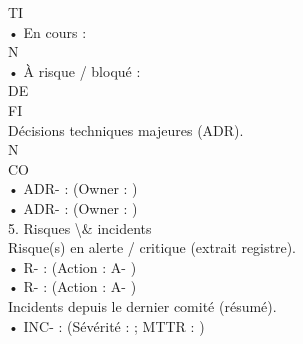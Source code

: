 \vspace{0.5em}
TI\\
• En cours :\\
\vspace{0.5em}
\vspace{0.5em}
\vspace{0.5em}
\vspace{0.5em}
N\\
• À risque / bloqué :\\
\vspace{0.5em}
\vspace{0.5em}
\vspace{0.5em}
\vspace{0.5em}
DE\\
FI\\
Décisions techniques majeures (ADR).\\
\vspace{0.5em}
\vspace{0.5em}
\vspace{0.5em}
N\\
CO\\
• ADR-             :                                                           (Owner :                           )\\
\vspace{0.5em}
• ADR-             :                                                           (Owner :                           )\\
\vspace{0.5em}
\vspace{0.5em}
\vspace{0.5em}
5. Risques \textbackslash{}& incidents\\
Risque(s) en alerte / critique (extrait registre).\\
• R-           :                                                              (Action : A-       )\\
\vspace{0.5em}
• R-           :                                                              (Action : A-       )\\
\vspace{0.5em}
\vspace{0.5em}
\vspace{0.5em}
Incidents depuis le dernier comité (résumé).\\
• INC-                 :                                                          (Sévérité :         ; MTTR :          )\\
\vspace{0.5em}
